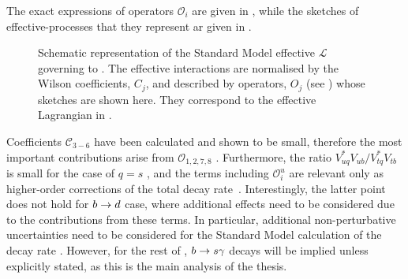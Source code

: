 The exact expressions of operators $\mathcal{O}_i$ are given in , while the sketches of effective-processes that they represent ar given in .
\begin{figure}[htbp!]
    
\caption{\label{fig:b_to_s_gamma_effective}
Schematic representation of the Standard Model effective $\mathcal{L}$ governing to \BtoXsgamma. 
The effective interactions are normalised by the Wilson coefficients, $C_j$, and described by operators, $O_j$ (see ) whose sketches are shown here.
They correspond to the effective Lagrangian in .
}
\end{figure}
Coefficients $\mathcal{C}_{3-6}$ have been calculated and shown to be small, therefore the most important contributions arise from $\mathcal{O}_{1,2,7,8}$ \cite{Chetyrkin:1996vx,Misiak:2020vlo}.
Furthermore, the ratio $V^*_{uq}V_{ub}/V^*_{tq}V_{tb}$ is small for the case of $q=s$ \cite{Charles:2015gya}, and the terms including $\mathcal{O}^u_i$ are relevant only as higher-order corrections of the total decay rate~\cite{Misiak:2015xwa}.
Interestingly, the latter point does not hold for $b\rightarrow d$ case, where additional effects need to be considered due to the contributions from these terms.
In particular, additional non-perturbative uncertainties need to be considered for the Standard Model calculation of the decay rate \cite{Misiak:2015xwa}.
However, for the rest of , $b\rightarrow s\gamma$ decays will be implied unless explicitly stated, as this is the main analysis of the thesis.

